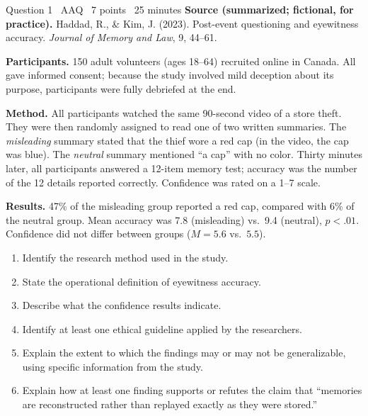 \documentclass[11pt]{article}
\begin{document}
\begin{frq}{Question 1 \textperiodcentered\ AAQ \textperiodcentered\ 7 points \textperiodcentered\ 25 minutes}
\small
\textbf{Source (summarized; fictional, for practice).} Haddad, R., \& Kim, J. (2023). Post-event questioning and eyewitness accuracy. \emph{Journal of Memory and Law}, 9, 44--61.

\textbf{Participants.} 150 adult volunteers (ages 18--64) recruited online in Canada. All gave informed consent; because the study involved mild deception about its purpose, participants were fully debriefed at the end.

\textbf{Method.} All participants watched the same 90-second video of a store theft. They were then randomly assigned to read one of two written summaries. The \emph{misleading} summary stated that the thief wore a red cap (in the video, the cap was blue). The \emph{neutral} summary mentioned ``a cap'' with no color. Thirty minutes later, all participants answered a 12-item memory test; accuracy was the number of the 12 details reported correctly. Confidence was rated on a 1--7 scale.

\textbf{Results.} 47\% of the misleading group reported a red cap, compared with 6\% of the neutral group. Mean accuracy was 7.8 (misleading) vs.\ 9.4 (neutral), \(p < .01\). Confidence did not differ between groups (\(M = 5.6\) vs.\ \(5.5\)).

\medskip
\begin{enumerate}[label=(\Alph*),leftmargin=2em,itemsep=3pt]
\item Identify the research method used in the study.
\item State the operational definition of eyewitness accuracy.
\item Describe what the confidence results indicate.
\item Identify at least one ethical guideline applied by the researchers.
\item Explain the extent to which the findings may or may not be generalizable, using specific information from the study.
\item Explain how at least one finding supports or refutes the claim that ``memories are reconstructed rather than replayed exactly as they were stored.''
\end{enumerate}
\end{frq}

\makekey
\end{document}
